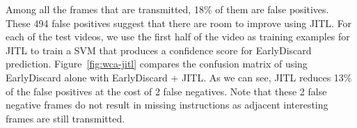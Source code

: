 Among all the frames that are transmitted, 18\% of them are false positives.
These 494 false positives suggest that there are room to improve using JITL. For
each of the test videos, we use the first half of the video as training examples
for JITL to train a SVM that produces a confidence score for EarlyDiscard
prediction. Figure~\ref{fig:wca-jitl} compares the confusion matrix of using
EarlyDiscard alone with EarlyDiscard + JITL. As we can see, JITL reduces 13\% of
the false positives at the cost of 2 false negatives. Note that these 2 false
negative frames do not result in missing instructions as adjacent interesting
frames are still transmitted.


